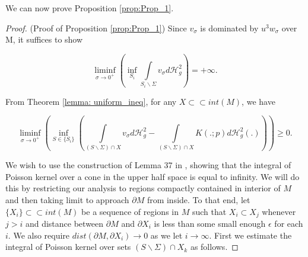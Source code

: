 \documentclass{amsart}
\newcommand{\hm}{\mathscr{H}}
\newcommand{\s}{\Sigma}
\theoremstyle{named}
\begin{document}

We can now prove Proposition \ref{prop:Prop_1}.

\begin{proof}(Proof of Proposition \ref{prop:Prop_1})
    Since $v_{\sigma}$ is dominated by $u^3w_{\sigma}$ over M, it suffices to show 
    
    \begin{equation} \nonumber
        \liminf\limits_{\sigma \xrightarrow{} 0^{+}} \left( \inf\limits_{S_i} \int\limits_{S_i \backslash \Sigma} v_{\sigma}d\hm^2_g \right) = +\infty.
    \end{equation}
    
    From Theorem \ref{lemma: uniform_ineq}, for any $X \subset\subset int(M)$, we have

    \begin{equation}\label{eq:Prop_1}
        \liminf\limits_{\sigma \xrightarrow{} 0^{+}} \left( \inf\limits_{S \in \{S_i\}} \left( 
        \int\limits_{(S \backslash \Sigma) \cap X} v_{\sigma}d\hm^2_g - \int\limits_{(S \backslash \Sigma) \cap X} K (.;p)d\hm^2_g (.) \right) \right) \geq 0.
    \end{equation}
    
    We wish to use the construction of Lemma 37 in \cite{jeff}, showing that the integral of Poisson kernel over a cone in the upper half space is equal to infinity. We will do this by restricting our analysis to regions compactly contained in interior of $M$ and then taking limit to approach $\partial M$ from inside. To that end, let $\{X_i\} \subset\subset int(M)$ be a sequence of regions in $M$ such that $X_i \subset X_j$ whenever $j > i$ and distance between $\partial M$ and $\partial X_i$ is less than some small enough $\epsilon$ for each $i$. We also require $dist(\partial M, \partial X_i) \rightarrow 0$ as we let $i \rightarrow \infty$. First we estimate the integral of Poisson kernel over sets $(S \backslash \s) \cap X_k$ as follows.


\end{proof}
\end{document}
